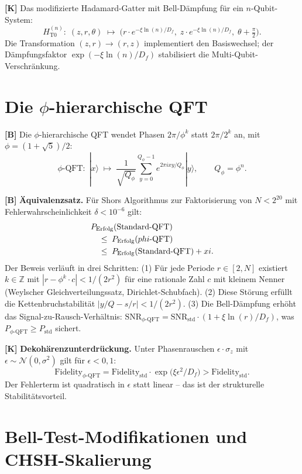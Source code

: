 \textbf{[K]} Das modifizierte Hadamard-Gatter mit Bell-Dämpfung für ein $n$-Qubit-System:
\[
  H_{\text{T0}}^{(n)}:\; (z,r,\theta)\;\mapsto\;
  \bigl(r\cdot e^{-\xi\ln(n)/D_f},\;z\cdot e^{-\xi\ln(n)/D_f},\;
  \theta+\tfrac\pi2\bigr).
\]
Die Transformation $(z,r)\to(r,z)$ implementiert den Basiswechsel; der
Dämpfungsfaktor $\exp(-\xi\ln(n)/D_f)$ stabilisiert die Multi-Qubit-Verschränkung.

\section{Die \texorpdfstring{$\phi$}{phi}-hierarchische QFT}

\textbf{[B]} Die $\phi$-hierarchische QFT wendet Phasen $2\pi/\phi^k$ statt
$2\pi/2^k$ an, mit $\phi=(1+\sqrt5)/2$:
\[
  \phi\text{-QFT}:\;|x\rangle\;\mapsto\;
  \frac{1}{\sqrt{Q_\phi}}\sum_{y=0}^{Q_\phi-1} e^{2\pi i xy/Q_\phi}|y\rangle,
  \qquad Q_\phi=\phi^n.
\]

\textbf{[B]} \textbf{Äquivalenzsatz.} Für Shors Algorithmus zur Faktorisierung
von $N<2^{20}$ mit Fehlerwahrscheinlichkeit $\delta<10^{-6}$ gilt:
\begin{align}
  &P_{\text{Erfolg}}(\text{Standard-QFT}) \notag\\
  &\quad\le\;P_{\text{Erfolg}}(\phi\text{-QFT}) \notag\\
  &\quad\le\;P_{\text{Erfolg}}(\text{Standard-QFT}) + \xi. \notag
\end{align}
Der Beweis verläuft in drei Schritten: (1) Für jede Periode $r\in[2,N]$
existiert $k\in\mathbb Z$ mit $|r-\phi^k\cdot c|<1/(2r^2)$ für eine rationale
Zahl $c$ mit kleinem Nenner (Weylscher Gleichverteilungssatz, Dirichlet-Schubfach).
(2) Diese Störung erfüllt die Kettenbruchstabilität
$|y/Q-s/r|<1/(2r^2)$. (3) Die Bell-Dämpfung erhöht das Signal-zu-Rausch-Verhältnis:
$\text{SNR}_{\phi\text{-QFT}} = \text{SNR}_\text{std}\cdot(1+\xi\ln(r)/D_f)$,
was $P_{\phi\text{-QFT}}\ge P_\text{std}$ sichert.

\textbf{[K]} \textbf{Dekohärenzunterdrückung.} Unter Phasenrauschen
$\epsilon\cdot\sigma_z$ mit $\epsilon\sim\mathcal N(0,\sigma^2)$ gilt für
$\epsilon<0{,}1$:
\[
  \text{Fidelity}_{\phi\text{-QFT}}
  = \text{Fidelity}_\text{std}\cdot\exp\!\bigl(\xi\epsilon^2/D_f\bigr)
  > \text{Fidelity}_\text{std}.
\]
Der Fehlerterm ist quadratisch in $\epsilon$ statt linear -- das ist der
strukturelle Stabilitätsvorteil.

\section{Bell-Test-Modifikationen und CHSH-Skalierung}


